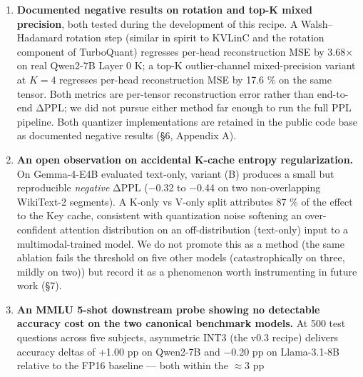 \begin{enumerate}
{  per-row baseline (A) on four of the eight (Mistral, Qwen2.5-14B,
  Llama-3.1-8B, GPT-J-6B).} A direct measurement of per-token L2 norm
  dispersion on Layer-0 K and V caches across all eight models (§5.3,
  Appendix E) supports a refined mechanism claim: \textbf{L0 V-cache
  per-token L2 norm CV correlates strongly with (B)'s regression
  magnitude (Spearman \(\rho \approx 0.88\)), while L0 K-cache CV does
  not (\(\rho \approx 0.29\))}. We therefore argue that \texttt{nsep} is
  a structural ingredient for per-channel KV quantization specifically
  because V-cache reconstruction error bypasses the softmax
  normalization that partially absorbs K-cache error, rather than a
  generic quality-of-life preprocessing step (§5.3).
\item
  \textbf{Documented negative results on rotation and top-K mixed
  precision}, both tested during the development of this recipe. A
  Walsh--Hadamard rotation step (similar in spirit to KVLinC and the
  rotation component of TurboQuant) regresses per-head reconstruction
  MSE by 3.68× on real Qwen2-7B Layer 0 K; a top-K outlier-channel
  mixed-precision variant at \(K = 4\) regresses per-head reconstruction
  MSE by 17.6 \% on the same tensor. Both metrics are per-tensor
  reconstruction error rather than end-to-end ΔPPL; we did not pursue
  either method far enough to run the full PPL pipeline. Both quantizer
  implementations are retained in the public code base as documented
  negative results (§6, Appendix A).
\item
  \textbf{An open observation on accidental K-cache entropy
  regularization.} On Gemma-4-E4B evaluated text-only, variant (B)
  produces a small but reproducible \emph{negative} ΔPPL (−0.32 to −0.44
  on two non-overlapping WikiText-2 segments). A K-only vs V-only split
  attributes 87 \% of the effect to the Key cache, consistent with
  quantization noise softening an over-confident attention distribution
  on an off-distribution (text-only) input to a multimodal-trained
  model. We do not promote this as a method (the same ablation fails the
  threshold on five other models (catastrophically on three, mildly on
  two)) but record it as a phenomenon worth instrumenting in future work
  (§7).
\item
  \textbf{An MMLU 5-shot downstream probe showing no detectable accuracy
  cost on the two canonical benchmark models.} At 500 test questions
  across five subjects, asymmetric INT3 (the v0.3 recipe) delivers
  accuracy deltas of +1.00 pp on Qwen2-7B and −0.20 pp on Llama-3.1-8B
  relative to the FP16 baseline --- both within the \(\approx 3\) pp

\end{enumerate}

